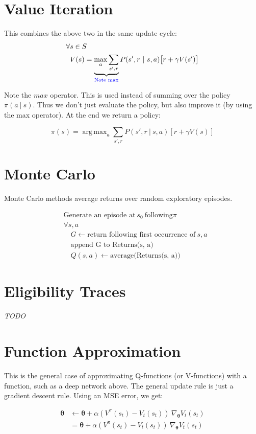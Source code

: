 \documentclass{article}
\newcommand{\bm}[1]{\mathbf{#1}}
\newcommand{\giv}{\ |\ }
\DeclareMathOperator*{\argmax}{arg\,max}
\newcommand{\blue}[1]{\textcolor{blue}{#1}}
\begin{document}
\section{Value Iteration}
This combines the above two in the same update cycle:
\begin{align*}
    \forall& s \in S \\
    & V(s) = \underbrace{\max_a \sum_{s', r}}_{\blue{\text{Note max}}} P(s', r \giv s, a) \big[ r + \gamma V(s') \big]
\end{align*}

Note the $max$ operator. This is used instead of summing over the policy $\pi(a \giv s)$. Thus we don't just evaluate the policy, but also improve it (by using the max operator). At the end we return a policy:

\begin{equation*}
    \pi(s) = \argmax_a \sum_{s', r} P(s', r \giv s, a) [r + \gamma V(s)]
\end{equation*}

\section{Monte Carlo}
Monte Carlo methods average returns over random exploratory episodes.

\begin{align*}
    &\text{Generate an episode at}\ s_0\ \text{following} \pi \\
    &\forall s, a \\
    &\quad G \gets \text{return following first occurrence of}\ s, a \\
    &\quad \text{append G to Returns(s, a)} \\
    &\quad Q(s, a) \gets \text{average(Returns(s, a))}
\end{align*}

\section{Eligibility Traces}
    \textit{TODO}

\section{Function Approximation}
This is the general case of approximating Q-functions (or V-functions) with a function, such as a deep network above. The general update rule is just a gradient descent rule. Using an MSE error, we get:

\begin{align*}
    \bm{\theta} &\gets \bm{\theta} + \alpha(V^\pi(s_t) - V_t(s_t)) \ \nabla_\bm{\theta} V_t(s_t) \\
    &= \bm{\theta} + \alpha(V^\pi(s_t) - V_t(s_t)) \ \nabla_\bm{\theta} V_t(s_t)
\end{align*}
\end{document}
